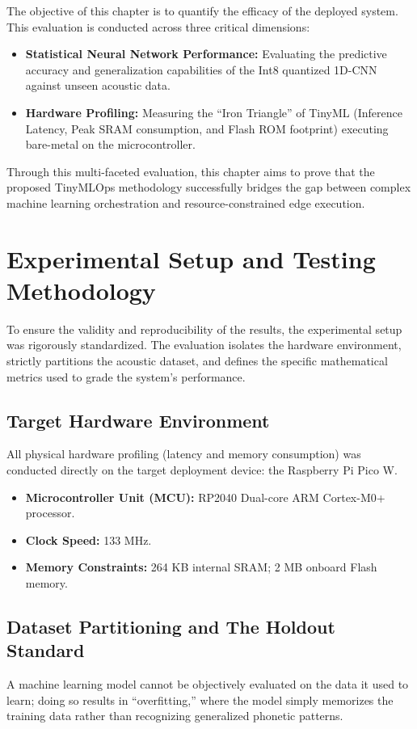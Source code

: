 \documentclass[11pt,a4paper,openany]{book}
\begin{document}
The objective of this chapter is to quantify the efficacy of the deployed system. This evaluation is conducted across three critical dimensions:
\begin{itemize}
    \item \textbf{Statistical Neural Network Performance:} Evaluating the predictive accuracy and generalization capabilities of the Int8 quantized 1D-CNN against unseen acoustic data.
    \item \textbf{Hardware Profiling:} Measuring the ``Iron Triangle'' of TinyML (Inference Latency, Peak SRAM consumption, and Flash ROM footprint) executing bare-metal on the microcontroller.
\end{itemize}

Through this multi-faceted evaluation, this chapter aims to prove that the proposed TinyMLOps methodology successfully bridges the gap between complex machine learning orchestration and resource-constrained edge execution.

\section{Experimental Setup and Testing Methodology}
To ensure the validity and reproducibility of the results, the experimental setup was rigorously standardized. The evaluation isolates the hardware environment, strictly partitions the acoustic dataset, and defines the specific mathematical metrics used to grade the system's performance.

\subsection{Target Hardware Environment}
All physical hardware profiling (latency and memory consumption) was conducted directly on the target deployment device: the Raspberry Pi Pico W.
\begin{itemize}
    \item \textbf{Microcontroller Unit (MCU):} RP2040 Dual-core ARM Cortex-M0+ processor.
    \item \textbf{Clock Speed:} 133 MHz.
    \item \textbf{Memory Constraints:} 264 KB internal SRAM; 2 MB onboard Flash memory.
\end{itemize}

\subsection{Dataset Partitioning and The Holdout Standard}
A machine learning model cannot be objectively evaluated on the data it used to learn; doing so results in ``overfitting,'' where the model simply memorizes the training data rather than recognizing generalized phonetic patterns.
\end{document}
